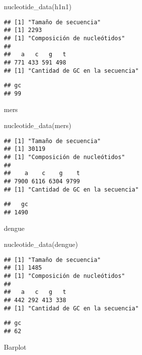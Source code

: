 \documentclass[
]{article}
\newenvironment{Shaded}{\begin{snugshade}}{\end{snugshade}}
\newcommand{\FunctionTok}[1]{\textcolor[rgb]{0.00,0.00,0.00}{#1}}
\newcommand{\NormalTok}[1]{#1}
\begin{document}
\begin{Shaded}
\begin{Highlighting}[]
\FunctionTok{nucleotide\_data}\NormalTok{(h1n1)}
\end{Highlighting}
\end{Shaded}

\begin{verbatim}
## [1] "Tamaño de secuencia"
## [1] 2293
## [1] "Composición de nucleótidos"
## 
##   a   c   g   t 
## 771 433 591 498 
## [1] "Cantidad de GC en la secuencia"
\end{verbatim}

\begin{verbatim}
## gc 
## 99
\end{verbatim}

mers

\begin{Shaded}
\begin{Highlighting}[]
\FunctionTok{nucleotide\_data}\NormalTok{(mers)}
\end{Highlighting}
\end{Shaded}

\begin{verbatim}
## [1] "Tamaño de secuencia"
## [1] 30119
## [1] "Composición de nucleótidos"
## 
##    a    c    g    t 
## 7900 6116 6304 9799 
## [1] "Cantidad de GC en la secuencia"
\end{verbatim}

\begin{verbatim}
##   gc 
## 1490
\end{verbatim}

dengue

\begin{Shaded}
\begin{Highlighting}[]
\FunctionTok{nucleotide\_data}\NormalTok{(dengue)}
\end{Highlighting}
\end{Shaded}

\begin{verbatim}
## [1] "Tamaño de secuencia"
## [1] 1485
## [1] "Composición de nucleótidos"
## 
##   a   c   g   t 
## 442 292 413 338 
## [1] "Cantidad de GC en la secuencia"
\end{verbatim}

\begin{verbatim}
## gc 
## 62
\end{verbatim}

Barplot
\end{document}
